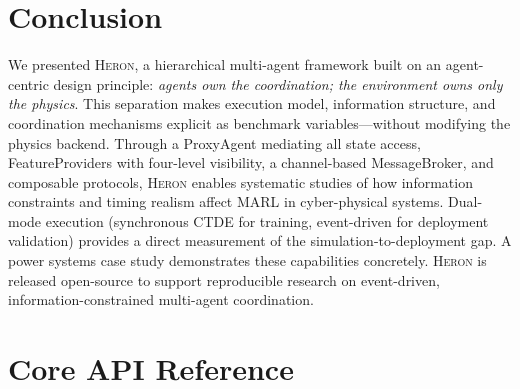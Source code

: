 \documentclass{article}
\newcommand{\heron}{\textsc{Heron}}
\begin{document}
\section{Conclusion}
\label{sec:conclusion}

We presented \heron{}, a hierarchical multi-agent framework built on an agent-centric design principle: \emph{agents own the coordination; the environment owns only the physics}. This separation makes execution model, information structure, and coordination mechanisms explicit as benchmark variables---without modifying the physics backend. Through a ProxyAgent mediating all state access, FeatureProviders with four-level visibility, a channel-based MessageBroker, and composable protocols, \heron{} enables systematic studies of how information constraints and timing realism affect MARL in cyber-physical systems. Dual-mode execution (synchronous CTDE for training, event-driven for deployment validation) provides a direct measurement of the simulation-to-deployment gap. A power systems case study demonstrates these capabilities concretely. \heron{} is released open-source to support reproducible research on event-driven, information-constrained multi-agent coordination.





\newpage
\appendix

\section{Core API Reference}
\label{app:api}
\end{document}
